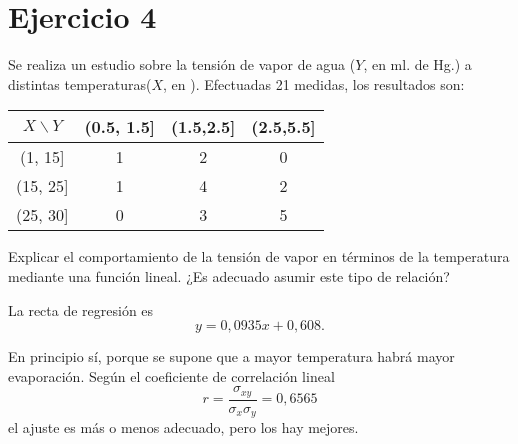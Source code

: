 \documentclass[10pt]{article}
\begin{document}
\section*{Ejercicio 4}

Se realiza un estudio sobre la tensión de vapor de agua ($Y$, en ml. de Hg.) a distintas temperaturas($X$, en \textcelsius{}). Efectuadas 21 medidas, los resultados son:

\begin{center}
\begin{tabular}{c|ccc}
$X \backslash Y$ & (0.5, 1.5] & (1.5,2.5] & (2.5,5.5]\\\hline
(1, 15] & 1 & 2 & 0 \\
(15, 25] & 1 & 4 & 2 \\
(25, 30] & 0 & 3 & 5 \\
\end{tabular}
\end{center}

Explicar el comportamiento de la tensión de vapor en términos de la temperatura mediante una función lineal. ¿Es adecuado asumir este tipo de relación?

La recta de regresión es $$y = 0,0935x + 0,608.$$

En principio sí, porque se supone que a mayor temperatura habrá mayor evaporación.
Según el coeficiente de correlación lineal $$r = \frac{\sigma_{xy}}{\sigma_x\sigma_y} = 0,6565$$ el ajuste es más o menos adecuado, pero los hay mejores.
\end{document}

